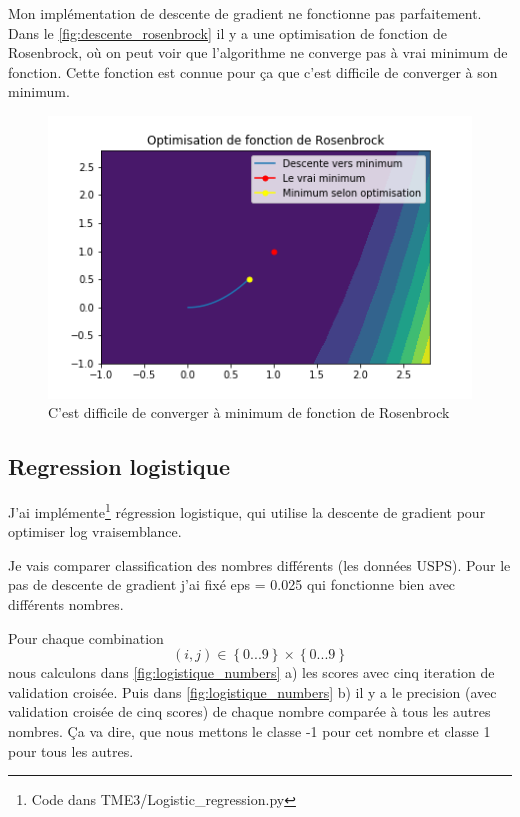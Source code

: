 \documentclass[a4paper,12pt]{article}
\begin{document}
Mon implémentation de descente de gradient ne fonctionne pas parfaitement. 
Dans le \autoref{fig:descente_rosenbrock} il y a une optimisation de fonction de Rosenbrock, où on peut voir que l'algorithme ne converge pas à vrai minimum de fonction. 
Cette fonction est connue pour ça que c'est difficile de converger à son minimum.

\begin{figure}[h!]
\caption{C'est difficile de converger à minimum de fonction de Rosenbrock}
\label{fig:descente_rosenbrock}
\centering
\includegraphics[width=0.4\linewidth]{images/tme3/descente_rosenbrock.png}
\end{figure}%

\subsection{Regression logistique}

J'ai implémente\footnote{Code dans TME3\slash Logistic\_regression.py} 
régression logistique, qui utilise la descente de gradient pour optimiser log vraisemblance.

Je vais comparer classification des nombres différents (les données USPS). 
Pour le pas de descente de gradient j'ai fixé eps = 0.025 qui fonctionne bien avec différents nombres.

Pour chaque combination $$\left ( i,j \right ) \in \left \{ 0...9 \right \} \times  \left \{ 0...9 \right \}$$ 
nous calculons dans \autoref{fig:logistique_numbers} a) les scores avec cinq iteration de validation croisée.
Puis dans \autoref{fig:logistique_numbers} b) il y a le precision (avec validation croisée de cinq scores) de chaque nombre comparée à tous les autres nombres.
Ça va dire, que nous mettons le classe -1 pour cet nombre et classe 1 pour tous les autres.
\end{document}
